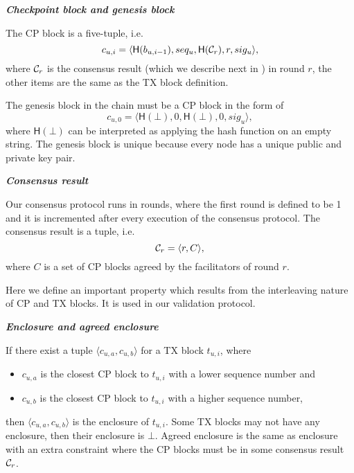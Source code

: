 
\begin{definition}
\textbf{\emph{Checkpoint block and genesis block}}

The CP block is a five-tuple, i.e. 
$$c_{u, i} = \langle \textsf{H}(b_{u, i-1}), seq_u, \textsf{H}(\mathcal{C}_r), r, sig_u \rangle,$$
where $\mathcal{C}_r$ is the consensus result (which we describe next in ) in round $r$,
the other items are the same as the TX block definition.

The genesis block in the chain must be a CP block in the form of
$$c_{u, 0} = \langle \textsf{H}(\bot), 0,  \textsf{H}(\bot), 0, sig_u \rangle,$$
where $\textsf{H}(\bot)$ can be interpreted as applying the hash function on an empty string.
The genesis block is unique because every node has a unique public and private key pair.
\end{definition}


\begin{definition}
\label{sec:consensus-result}
\textbf{\emph{Consensus result}}

Our consensus protocol runs in rounds,
where the first round is defined to be 1 and it is incremented after every execution of the consensus protocol.
The consensus result is a tuple, i.e. 
$$\mathcal{C}_r = \langle r, C \rangle,$$
where $C$ is a set of CP blocks agreed by the facilitators of round $r$.
\end{definition}

Here we define an important property which results from the interleaving nature of CP and TX blocks.
It is used in our validation protocol.
\begin{definition}
\textbf{\emph{Enclosure and agreed enclosure}}

If there exist a tuple $\langle c_{u,a}, c_{u, b} \rangle$ for a TX block $t_{u, i}$, where
\begin{itemize}
\item $c_{u, a}$ is the closest CP block to $t_{u, i}$ with a lower sequence number and
\item $c_{u, b}$ is the closest CP block to $t_{u, i}$ with a higher sequence number,
\end{itemize}
then $\langle c_{u,a}, c_{u, b} \rangle$ is the enclosure of $t_{u, i}$.
Some TX blocks may not have any enclosure, then their enclosure is $\bot$.
Agreed enclosure is the same as enclosure with an extra constraint where the CP blocks must be in some consensus result $\mathcal{C}_r$.

\end{definition}

